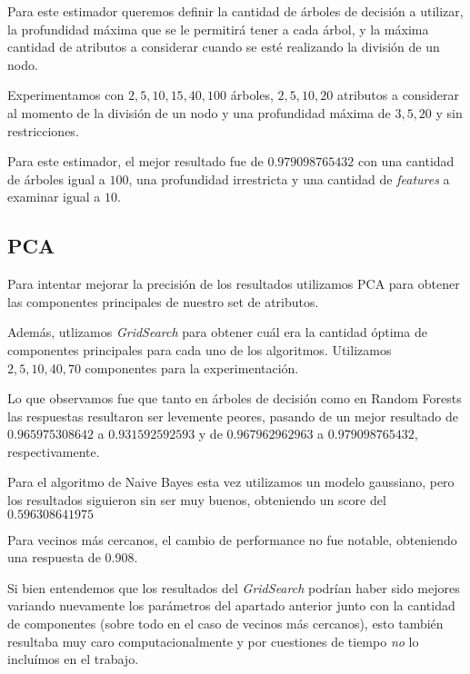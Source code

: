 Para este estimador queremos definir la cantidad de árboles de decisión a utilizar, la profundidad máxima que se le permitirá tener a cada árbol, y la máxima cantidad de atributos a considerar cuando se esté realizando la división de un nodo.

Experimentamos con $2,5,10,15,40,100$ árboles, $2,5,10,20$ atributos a considerar al momento de la división de un nodo y una profundidad máxima de $3,5,20$ y sin restricciones.


Para este estimador, el mejor resultado fue de $0.979098765432$ con una cantidad de árboles igual a $100$, una profundidad irrestricta y una cantidad de \textit{features} a examinar igual a $10$.


\subsection{PCA}

Para intentar mejorar la precisión de los resultados utilizamos PCA para obtener las componentes principales de nuestro set de atributos. 

Además, utlizamos \textit{GridSearch} para obtener cuál era la cantidad óptima de componentes principales para cada uno de los algoritmos. Utilizamos $2,5,10,40,70$ componentes para la experimentación.

Lo que observamos fue que tanto en árboles de decisión como en Random Forests las respuestas resultaron ser levemente peores, pasando de un mejor resultado de $0.965975308642$ a $0.931592592593$ y de $0.967962962963$ a $0.979098765432$, respectivamente.

Para el algoritmo de Naive Bayes esta vez utilizamos un modelo gaussiano, pero los resultados siguieron sin ser muy buenos, obteniendo un score del $0.596308641975$

Para vecinos más cercanos, el cambio de performance no fue notable, obteniendo una respuesta de 0.908.

Si bien entendemos que los resultados del \textit{GridSearch} podrían haber sido mejores variando nuevamente los parámetros del apartado anterior junto con la cantidad de componentes (sobre todo en el caso de vecinos más cercanos), esto también resultaba muy caro computacionalmente y por cuestiones de tiempo \textit{no} lo incluímos en el trabajo.

